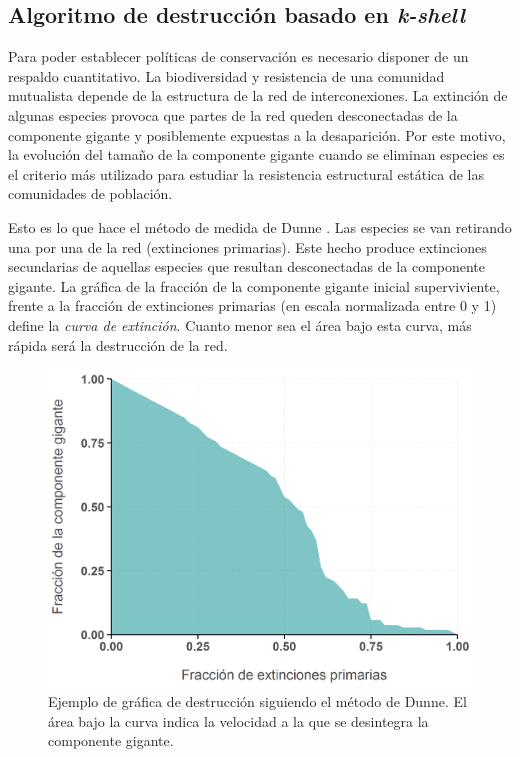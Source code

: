 \subsection{Algoritmo de destrucción basado en \textit{k-shell}}

Para poder establecer políticas de conservación es necesario disponer de un respaldo cuantitativo. La biodiversidad y resistencia de una comunidad mutualista depende de la estructura de la red de interconexiones. La extinción de algunas especies provoca que partes de la red queden desconectadas de la componente gigante y posiblemente expuestas a la desaparición. Por este motivo, la evolución del tamaño de la componente gigante cuando se eliminan especies es el criterio más utilizado para estudiar la resistencia estructural estática de las comunidades de población.

Esto es lo que hace el método de medida de Dunne \cite{dunne2002biodiversity}. Las especies se van retirando una por una de la red (extinciones primarias). Este hecho produce extinciones secundarias de aquellas especies que resultan desconectadas de la componente gigante. La gráfica de la fracción de la componente gigante inicial superviviente, frente a la fracción de extinciones primarias (en escala normalizada entre 0 y 1) define la \textit{curva de extinción}. Cuanto menor sea el área bajo esta curva, más rápida será la destrucción de la red.

\begin{figure}[h!]
\centering
\includegraphics[scale=0.55]{Figures/ESTATICA_destruction_example.png}
\caption{Ejemplo de gráfica de destrucción siguiendo el método de Dunne. El área bajo la curva indica la velocidad a la que se desintegra la componente gigante.}
\label{fig:ESTATICA_destruction_example}
\end{figure}

